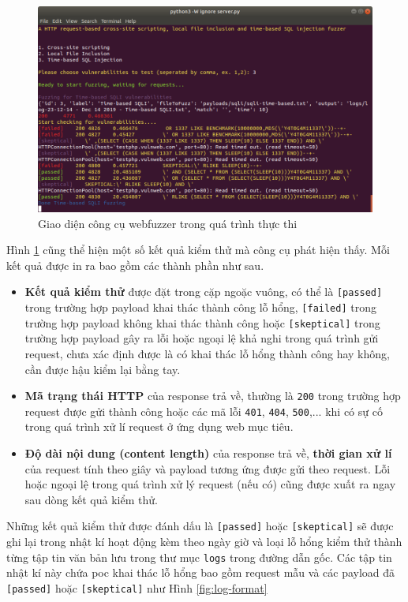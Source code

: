 \begin{figure}[H]
  \centering
    \includegraphics[width=\textwidth,keepaspectratio=true]{images/runtime-interface-2.png}
  \caption{Giao diện công cụ webfuzzer trong quá trình thực thi}
  \label{fig:runtime-interface}
\end{figure}
Hình \ref{fig:runtime-interface} cũng thể hiện một số kết quả kiểm thử mà công cụ phát hiện thấy. Mỗi kết quả được in ra bao gồm các thành phần như sau.
\begin{itemize}
    \item \textbf{Kết quả kiểm thử} được đặt trong cặp ngoặc vuông, có thể là \texttt{[passed]} trong trường hợp payload khai thác thành công lỗ hổng, \texttt{[failed]} trong trường hợp payload không khai thác thành công hoặc \texttt{[skeptical]} trong trường hợp payload gây ra lỗi hoặc ngoại lệ khả nghi trong quá trình gửi request, chưa xác định được là có khai thác lỗ hổng thành công hay không, cần được hậu kiểm lại bằng tay.
    \item \textbf{Mã trạng thái HTTP} của response trả về, thường là \texttt{200} trong trường hợp request được gửi thành công hoặc các mã lỗi \texttt{401}, \texttt{404}, \texttt{500},... khi có sự cố trong quá trình xử lí request ở ứng dụng web mục tiêu.
    \item \textbf{Độ dài nội dung (content length)} của response trả về, \textbf{thời gian xử lí} của request tính theo giây và payload tương ứng được gửi theo request. Lỗi hoặc ngoại lệ trong quá trình xử lý request (nếu có) cũng được xuất ra ngay sau dòng kết quả kiểm thử.
\end{itemize}
Những kết quả kiểm thử được đánh dấu là \texttt{[passed]} hoặc \texttt{[skeptical]} sẽ được ghi lại trong nhật kí hoạt động kèm theo ngày giờ và loại lỗ hổng kiểm thử thành từng tập tin văn bản lưu trong thư mục \texttt{logs} trong đường dẫn gốc. Các tập tin nhật kí này chứa \acrshort{poc} khai thác lỗ hổng bao gồm request mẫu và các payload đã \texttt{[passed]} hoặc \texttt{[skeptical]} như Hình \ref{fig:log-format}
